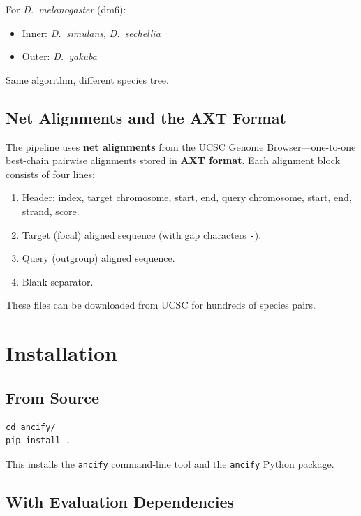 \documentclass[11pt,a4paper]{article}
\begin{document}
\begin{conceptbox}
For \textit{D.~melanogaster} (dm6):
\begin{itemize}
    \item Inner: \textit{D.~simulans}, \textit{D.~sechellia}
    \item Outer: \textit{D.~yakuba}
\end{itemize}
Same algorithm, different species tree.
\end{conceptbox}

\subsection{Net Alignments and the AXT Format}

The pipeline uses \textbf{net alignments} from the UCSC Genome Browser---one-to-one best-chain pairwise alignments stored in \textbf{AXT format}.  Each alignment block consists of four lines:

\begin{enumerate}
    \item Header: index, target chromosome, start, end, query chromosome, start, end, strand, score.
    \item Target (focal) aligned sequence (with gap characters \texttt{-}).
    \item Query (outgroup) aligned sequence.
    \item Blank separator.
\end{enumerate}

These files can be downloaded from UCSC for hundreds of species pairs.


\section{Installation}
\label{sec:install}

\subsection{From Source}

\begin{lstlisting}[style=bashstyle]
cd ancify/
pip install .
\end{lstlisting}

This installs the \texttt{ancify} command-line tool and the \texttt{ancify} Python package.

\subsection{With Evaluation Dependencies}
\end{document}
